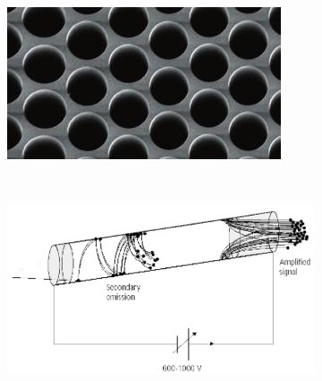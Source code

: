 \begin{figure}[!ht]
	\begin{subfigure}{0.5\textwidth}
		\includegraphics[width=\textwidth]{03_Prototype/figures/fig030_MCPoutline_b2.jpeg}
		\caption{}
		\label{}
  \end{subfigure}
  ~
	\begin{subfigure}{0.5\textwidth}
		\includegraphics[width=\textwidth]{03_Prototype/figures/fig030_MCPoutline_a.png}
		\caption{}
		\label{}
	\end{subfigure}
	\caption[]{}
	\label{chap:}
\end{figure}
